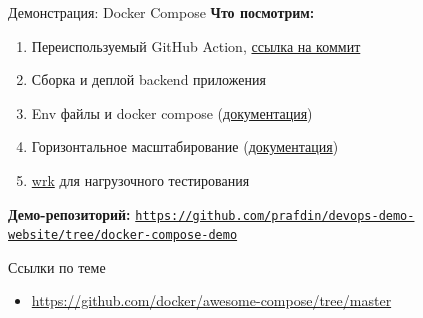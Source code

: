\documentclass[aspectratio=169]{beamer}
\begin{document}
\begin{frame}{Демонстрация: Docker Compose}
  \textbf{Что посмотрим:}
  \begin{enumerate}
    \item Переиспользуемый GitHub Action, \href{https://github.com/prafdin/devops-demo-website/commit/86806e7a8b98ba57f675a03affc6c98ec4843655}{ссылка на коммит}
    \item Сборка и деплой backend приложения
    \item Env файлы и docker compose (\href{https://docs.docker.com/compose/how-tos/environment-variables/variable-interpolation/\#env-file}{документация})
    \item Горизонтальное масштабирование (\href{https://docs.docker.com/reference/compose-file/services/\#scale}{документация})
    \item \href{https://github.com/wg/wrk}{wrk} для нагрузочного тестирования
  \end{enumerate}

  \vspace{0.2cm}

  \textbf{Демо-репозиторий:}
  \href{https://github.com/prafdin/devops-demo-website/tree/docker-compose-demo}{\texttt{https://github.com/prafdin/devops-demo-website/tree/docker-compose-demo}}

\end{frame}

\begin{frame}{Ссылки по теме}
  \begin{itemize}
    \item \url{https://github.com/docker/awesome-compose/tree/master}
  \end{itemize}
\end{frame}
\end{document}
